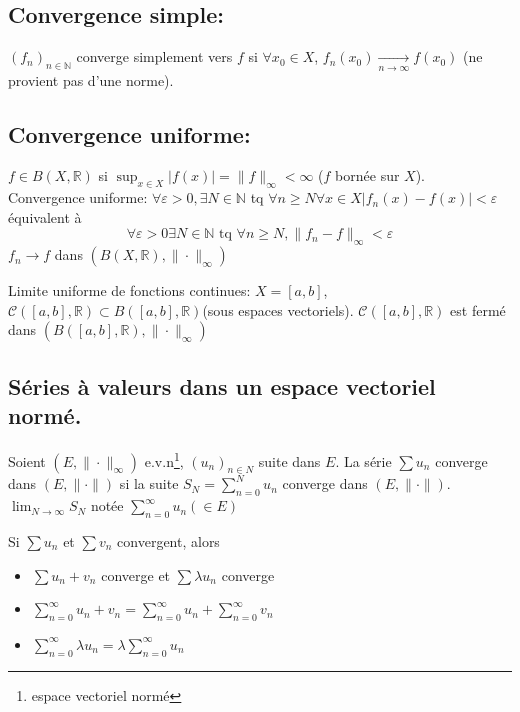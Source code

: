 \documentclass[a4paper]{report}
\newcommand\N{\ensuremath{\mathbb{N}}}
\newcommand\R{\ensuremath{\mathbb{R}}}
\theoremstyle{definition}
\begin{document}
\subsection{Convergence simple: }
\begin{definition}
    $(f_n)_{n \in \N}$ converge simplement vers $f$ si  $\forall x_0 \in X$, $f_n(x_0) \xrightarrow[n \to \infty]{} f(x_0)$ (ne provient pas d'une norme).
\end{definition}
\subsection{Convergence uniforme: }
\begin{definition}
    $f \in B(X, \R)$ si $\sup_{x \in X} |f(x)| = \|f\|_{\infty} < \infty$ ($f$ bornée sur  $X$). \\
    Convergence uniforme: $\forall \varepsilon > 0, \exists N \in \N$ tq $\forall n \ge N \forall x \in X |f_n(x) - f(x)| < \varepsilon$ équivalent à
    \[
    \forall \varepsilon > 0 \exists N \in \N \text{ tq } \forall n \ge N, \|f_n - f\|_{\infty} < \varepsilon
    \] 
    $f_n \to f$ dans $(B(X, \R), \| \cdot \|_{\infty})$
\end{definition}
\begin{definition}
    Limite uniforme de fonctions continues: $X = [a, b]$,  $\mathcal{C}([a, b], \R) \subset B([a, b], \R)$(sous espaces vectoriels). $\mathcal{C}([a, b], \R)$ est fermé dans $(B([a, b], \R), \| \cdot \|_{\infty})$
\end{definition}
\subsection{Séries à valeurs dans un espace vectoriel normé.}
\begin{definition}
     Soient $(E, \| \cdot \|_{\infty})$ e.v.n\footnote{espace vectoriel normé}, $(u_n)_{n \in N}$ suite dans $E$. La série  $\sum u_n$ converge dans  $(E, \| \cdot \|)$ si la suite $S_N = \sum_{n=0}^{N} u_n$ converge dans $(E, \| \cdot \|)$. $\lim_{N \to \infty} S_N$ notée $\sum_{n=0}^{\infty} u_n (\in E)$
\end{definition}
\begin{remark}
   Si $\sum u_n$ et  $\sum v_n$ convergent, alors  
   \begin{itemize}
       \item $\sum u_n + v_n$ converge et  $\sum \lambda u_n$ converge
       \item $\sum_{n=0}^{\infty} u_n + v_n = \sum_{n=0}^{\infty} u_n + \sum_{n=0}^{\infty} v_n$ 
       \item $\sum_{n=0}^{\infty} \lambda u_n = \lambda \sum_{n=0}^{\infty} u_n$
   \end{itemize}
\end{remark}
\end{document}

